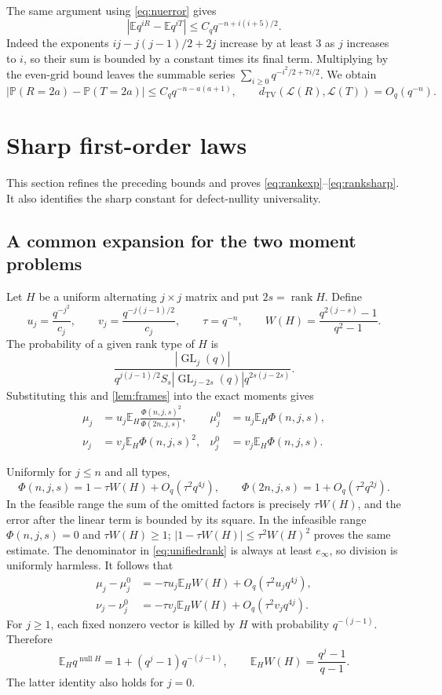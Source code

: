 \documentclass[11pt]{article}
\theoremstyle{definition}\newtheorem{definition}[theorem]{Definition}
\theoremstyle{remark}\newtheorem{remark}[theorem]{Remark}
\newcommand{\E}{\mathbb E}
\newcommand{\Prob}{\mathbb P}
\newcommand{\TV}{d_{\mathrm{TV}}}
\newcommand{\Law}{\mathcal L}
\newcommand{\GL}{\operatorname{GL}}
\newcommand{\nul}{\operatorname{null}}
\newcommand{\rank}{\operatorname{rank}}
\newcommand{\1}{\mathbf 1}
\begin{document}
The same argument using \eqref{eq:nuerror} gives
\[
 |\E q^{iR}-\E q^{iT}|\le C_q q^{-n+i(i+5)/2}.
\]
Indeed the exponents $ij-j(j-1)/2+2j$ increase by at least $3$ as $j$
increases to $i$, so their sum is bounded by a constant times its final
term. Multiplying by the even-grid bound leaves the summable series
$\sum_{i\ge0}q^{-i^2/2+7i/2}$. We obtain
\begin{equation}\label{eq:defectmassbound}
 |\Prob(R=2a)-\Prob(T=2a)|\le C_q q^{-n-a(a+1)},
 \qquad \TV(\Law(R),\Law(T))=O_q(q^{-n}).
\end{equation}

\section{Sharp first-order laws}\label{sec:sharp}

This section refines the preceding bounds and proves
\eqref{eq:rankexp}--\eqref{eq:ranksharp}. It also identifies the sharp
constant for defect-nullity universality.

\subsection{A common expansion for the two moment problems}
Let $H$ be a uniform alternating $j\times j$ matrix and put
$2s=\rank H$. Define
\[
 u_j=\frac{q^{-j^2}}{c_j},\qquad
 v_j=\frac{q^{-j(j-1)/2}}{c_j},\qquad \tau=q^{-n},\qquad
 W(H)=\frac{q^{2(j-s)}-1}{q^2-1}.
\]
The probability of a given rank type of $H$ is
\[
 \frac{|\GL_j(q)|}
 {q^{j(j-1)/2}S_s|\GL_{j-2s}(q)|q^{2s(j-2s)}}.
\]
Substituting this and \cref{lem:frames} into the exact moments gives
\begin{align}
 \mu_j&=u_j\E_H\frac{\Phi(n,j,s)^2}{\Phi(2n,j,s)},&
 \mu_j^0&=u_j\E_H\Phi(n,j,s),\label{eq:unifiedrank}\\
 \nu_j&=v_j\E_H\Phi(n,j,s)^2,&
 \nu_j^0&=v_j\E_H\Phi(n,j,s).\label{eq:unifieddefect}
\end{align}

Uniformly for $j\le n$ and all types,
\begin{equation}\label{eq:Phitaylor}
 \Phi(n,j,s)=1-\tau W(H)+O_q(\tau^2q^{4j}),\qquad
 \Phi(2n,j,s)=1+O_q(\tau^2q^{2j}).
\end{equation}
In the feasible range the sum of the omitted factors is precisely
$\tau W(H)$, and the error after the linear term is bounded by its square.
In the infeasible range $\Phi(n,j,s)=0$ and $\tau W(H)\ge1$;
$|1-\tau W(H)|\le\tau^2W(H)^2$ proves the same estimate. The denominator
in \eqref{eq:unifiedrank} is always at least $e_\infty$, so division is
uniformly harmless. It follows that
\begin{align}
 \mu_j-\mu_j^0
 &=-\tau u_j\E_HW(H)+O_q(\tau^2u_jq^{4j}),\label{eq:rankfirstmoment}\\
 \nu_j-\nu_j^0
 &=-\tau v_j\E_HW(H)+O_q(\tau^2v_jq^{4j}).\label{eq:defectfirstmoment}
\end{align}
For $j\ge1$, each fixed nonzero vector is killed by $H$ with probability
$q^{-(j-1)}$. Therefore
\[
 \E_Hq^{\nul H}=1+(q^j-1)q^{-(j-1)},\qquad
 \E_HW(H)=\frac{q^j-1}{q-1}.
\]
The latter identity also holds for $j=0$.
\end{document}
